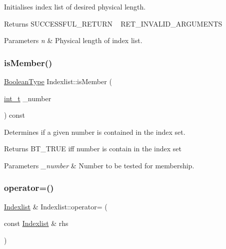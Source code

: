 Initialises index list of desired physical length. \begin{DoxyReturn}{Returns}
S\+U\+C\+C\+E\+S\+S\+F\+U\+L\+\_\+\+R\+E\+T\+U\+RN ~\newline
 R\+E\+T\+\_\+\+I\+N\+V\+A\+L\+I\+D\+\_\+\+A\+R\+G\+U\+M\+E\+N\+TS 
\end{DoxyReturn}

\begin{DoxyParams}{Parameters}
{\em n} & Physical length of index list. \\
\hline
\end{DoxyParams}
\mbox{\label{class_indexlist_a83ec064b8e0dff5171d60324520cda88}} 
\subsubsection{\texorpdfstring{is\+Member()}{isMember()}}
{\footnotesize\ttfamily \hyperlink{_types_8hpp_a20f82124c82b6f5686a7fce454ef9089}{Boolean\+Type} Indexlist\+::is\+Member (\begin{DoxyParamCaption}\item[{\hyperlink{_types_8hpp_ab6fd6105e64ed14a0c9281326f05e623}{int\+\_\+t}}]{\+\_\+number }\end{DoxyParamCaption}) const\hspace{0.3cm}{\ttfamily [inline]}}

Determines if a given number is contained in the index set. \begin{DoxyReturn}{Returns}
B\+T\+\_\+\+T\+R\+UE iff number is contain in the index set 
\end{DoxyReturn}

\begin{DoxyParams}{Parameters}
{\em \+\_\+number} & Number to be tested for membership. \\
\hline
\end{DoxyParams}
\mbox{\label{class_indexlist_a3f2085c6aed278494e5314691d155a93}} 
\subsubsection{\texorpdfstring{operator=()}{operator=()}}
{\footnotesize\ttfamily \hyperlink{class_indexlist}{Indexlist} \& Indexlist\+::operator= (\begin{DoxyParamCaption}\item[{const \hyperlink{class_indexlist}{Indexlist} \&}]{rhs }\end{DoxyParamCaption})}

